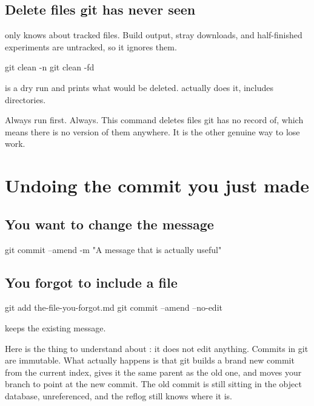 \documentclass[11pt]{article}
\begin{document}
\subsection{Delete files git has never seen}

 only knows about tracked files. Build output, stray downloads, and
half-finished experiments are untracked, so it ignores them.

\begin{shell}
git clean -n
git clean -fd
\end{shell}

 is a dry run and prints what would be deleted.  actually does it,
 includes directories.

\begin{trap}
Always run  first. Always. This command deletes files git has no
record of, which means there is no version of them anywhere. It is the other
genuine way to lose work.
\end{trap}

\section{Undoing the commit you just made}

\subsection{You want to change the message}

\begin{shell}
git commit --amend -m "A message that is actually useful"
\end{shell}

\subsection{You forgot to include a file}

\begin{shell}
git add the-file-you-forgot.md
git commit --amend --no-edit
\end{shell}

 keeps the existing message.

Here is the thing to understand about : it does not edit anything.
Commits in git are immutable. What actually happens is that git builds a brand new
commit from the current index, gives it the same parent as the old one, and moves
your branch to point at the new commit. The old commit is still sitting in the
object database, unreferenced, and the reflog still knows where it is.
\end{document}
